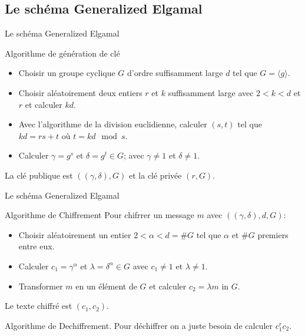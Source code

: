 \documentclass{beamer}
\begin{document}
\subsection{Le schéma Generalized Elgamal}
\begin{frame}{Le schéma Generalized Elgamal}
	\begin{block}{Algorithme de génération de clé}
		\begin{itemize}
			\item Choisir un groupe cyclique $G$ d'ordre suffisamment large $d$ tel que $G=\langle g \rangle$. \pause
			
			\item Choisir aléatoirement deux entiers $r$ et $k$ suffisamment large avec $ 2 < k < d$ et $r$ et calculer $kd$. \pause
			\item Avec l'algorithme de la division euclidienne, calculer $(s,t)$ tel que $kd= rs+t$ où $t = kd \mod s$. \pause
			
			\item Calculer $\gamma = g^{s} $ et $\delta = g^{t} \in G$; avec $\gamma \neq 1$ et $\delta \neq 1$. \pause
		\end{itemize}
		La clé publique est $((\gamma, \delta), G)$ et la clé privée $( r, G)$. \pause
		
	\end{block}
\end{frame}
\begin{frame}{Le schéma Generalized Elgamal}
		\begin{block}{Algorithme de Chiffrement}
		    Pour chifrrer un message $m$ avec $((\gamma, \delta), d, 
		G)$: \pause
		\begin{itemize}
			\item Choisir aléatoirement un entier $2<\alpha< d=\#G$ tel que $\alpha$ 
			et $\#G$ premiers entre eux. \pause
			\item Calculer $ c_{1}=\gamma^{\alpha} $ et
			$\lambda=\delta^{\alpha}\in G$ avec $ c_{1}\neq 1$ et $
			\lambda \neq 1$. \pause
			\item Transformer $m$ en un élément de $G$ et calculer
			$c_{2}=\lambda m$ in $G$. \pause
		\end{itemize}
		
		Le texte chiffré est $(c_{1}, c_{2})$. \pause
		\end{block}
			\begin{block}{Algorithme de Dechiffrement.}
			Pour déchiffrer on a juste besoin de calculer $c_{1}^{r}c_{2}$. \pause
			
		\end{block}
\end{frame}
\end{document}
